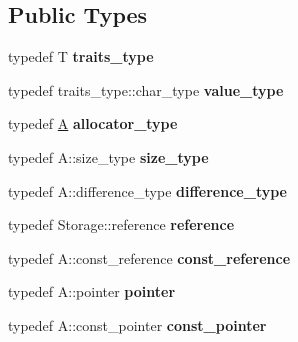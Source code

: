 \subsection*{Public Types}
\begin{DoxyCompactItemize}
\item 
\hypertarget{classflex__string_a66c448bc16b3cec175400864262d93fc}{}typedef T {\bfseries traits\+\_\+type}\label{classflex__string_a66c448bc16b3cec175400864262d93fc}

\item 
\hypertarget{classflex__string_a2cb8c0d8a782f5a7769654ba99a61618}{}typedef traits\+\_\+type\+::char\+\_\+type {\bfseries value\+\_\+type}\label{classflex__string_a2cb8c0d8a782f5a7769654ba99a61618}

\item 
\hypertarget{classflex__string_afcb5dbf4966814de3f16a301920e0c90}{}typedef \hyperlink{structA}{A} {\bfseries allocator\+\_\+type}\label{classflex__string_afcb5dbf4966814de3f16a301920e0c90}

\item 
\hypertarget{classflex__string_a7ae428793cf045d4e8544056e951c788}{}typedef A\+::size\+\_\+type {\bfseries size\+\_\+type}\label{classflex__string_a7ae428793cf045d4e8544056e951c788}

\item 
\hypertarget{classflex__string_ac1da64ed58cd3d8242e20cb9172aad5e}{}typedef A\+::difference\+\_\+type {\bfseries difference\+\_\+type}\label{classflex__string_ac1da64ed58cd3d8242e20cb9172aad5e}

\item 
\hypertarget{classflex__string_af1e8a979856e8eed0c7ba81a85b50226}{}typedef Storage\+::reference {\bfseries reference}\label{classflex__string_af1e8a979856e8eed0c7ba81a85b50226}

\item 
\hypertarget{classflex__string_a231b8f032142c847d20485cd3aed9aea}{}typedef A\+::const\+\_\+reference {\bfseries const\+\_\+reference}\label{classflex__string_a231b8f032142c847d20485cd3aed9aea}

\item 
\hypertarget{classflex__string_ac51291fb770b8855286dd7164504c542}{}typedef A\+::pointer {\bfseries pointer}\label{classflex__string_ac51291fb770b8855286dd7164504c542}

\item 
\hypertarget{classflex__string_adacef9509ba4579eca939f690aa10c63}{}typedef A\+::const\+\_\+pointer {\bfseries const\+\_\+pointer}\label{classflex__string_adacef9509ba4579eca939f690aa10c63}


\end{DoxyCompactItemize}
